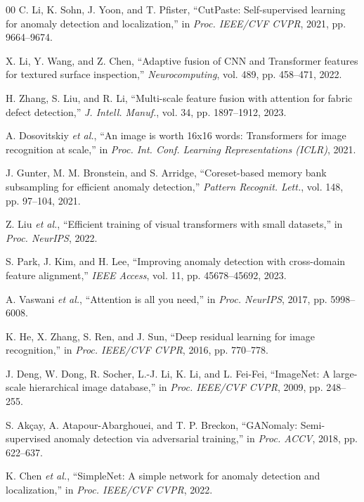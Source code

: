 \documentclass[journal]{IEEEtran}
\begin{document}
\begin{thebibliography}{00}
C. Li, K. Sohn, J. Yoon, and T. Pfister, ``CutPaste: Self-supervised learning for anomaly detection and localization,'' in \textit{Proc. IEEE/CVF CVPR}, 2021, pp. 9664--9674.

X. Li, Y. Wang, and Z. Chen, ``Adaptive fusion of CNN and Transformer features for textured surface inspection,'' \textit{Neurocomputing}, vol. 489, pp. 458--471, 2022.

H. Zhang, S. Liu, and R. Li, ``Multi-scale feature fusion with attention for fabric defect detection,'' \textit{J. Intell. Manuf.}, vol. 34, pp. 1897--1912, 2023.

A. Dosovitskiy \textit{et al.}, ``An image is worth 16x16 words: Transformers for image recognition at scale,'' in \textit{Proc. Int. Conf. Learning Representations (ICLR)}, 2021.

J. Gunter, M. M. Bronstein, and S. Arridge, ``Coreset-based memory bank subsampling for efficient anomaly detection,'' \textit{Pattern Recognit. Lett.}, vol. 148, pp. 97--104, 2021.

Z. Liu \textit{et al.}, ``Efficient training of visual transformers with small datasets,'' in \textit{Proc. NeurIPS}, 2022.

S. Park, J. Kim, and H. Lee, ``Improving anomaly detection with cross-domain feature alignment,'' \textit{IEEE Access}, vol. 11, pp. 45678--45692, 2023.

A. Vaswani \textit{et al.}, ``Attention is all you need,'' in \textit{Proc. NeurIPS}, 2017, pp. 5998--6008.

K. He, X. Zhang, S. Ren, and J. Sun, ``Deep residual learning for image recognition,'' in \textit{Proc. IEEE/CVF CVPR}, 2016, pp. 770--778.

J. Deng, W. Dong, R. Socher, L.-J. Li, K. Li, and L. Fei-Fei, ``ImageNet: A large-scale hierarchical image database,'' in \textit{Proc. IEEE/CVF CVPR}, 2009, pp. 248--255.

S. Ak\c{c}ay, A. Atapour-Abarghouei, and T. P. Breckon, ``GANomaly: Semi-supervised anomaly detection via adversarial training,'' in \textit{Proc. ACCV}, 2018, pp. 622--637.

K. Chen \textit{et al.}, ``SimpleNet: A simple network for anomaly detection and localization,'' in \textit{Proc. IEEE/CVF CVPR}, 2022.


\end{thebibliography}
\end{document}
